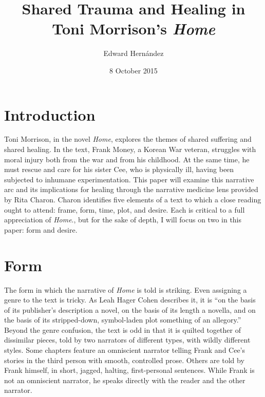 \documentclass[12pt]{article}
\begin{document}
\title{Shared Trauma and Healing in Toni Morrison's \emph{Home}}
\author{Edward Hern\'{a}ndez}
\date{8 October 2015}

\maketitle


\vspace{12pt}

\section{Introduction}

Toni Morrison, in the novel \emph{Home}\autocite{Morrison12}, explores the
themes of shared suffering and shared healing. In the text, Frank Money, a
Korean War veteran, struggles with moral injury both from the war and from his
childhood. At the same time, he must rescue and care for his sister Cee, who is
physically ill, having been subjected to inhumane experimentation.  This paper
will examine this narrative arc and its implications for healing through the
narrative medicine lens provided by Rita Charon.\autocite[ch.~6]{Charon06}
Charon identifies five elements of a text to which a close reading ought to
attend: frame, form, time, plot, and desire. Each is critical to a full
appreciation of \emph{Home}., but for the sake of depth, I will focus on two in
this paper: form and desire.

\section{Form}

The form in which the narrative of \emph{Home} is told is striking. Even
assigning a genre to the text is tricky. As Leah Hager Cohen describes it, it
is ``on the basis of its publisher’s description a novel, on the basis of its
length a novella, and on the basis of its stripped-down, symbol-laden plot
something of an allegory.''\autocite{Cohen12} Beyond the genre confusion, the
text is odd in that it is quilted together of dissimilar pieces, told by two
narrators of different types, with wildly different styles. Some chapters
feature an omniscient narrator telling Frank and Cee's stories in the third
person with smooth, controlled prose. Others are told by Frank himself, in
short, jagged, halting, first-personal sentences. While Frank is not an
omniscient narrator, he speaks directly with the reader and the other narrator.
\end{document}
